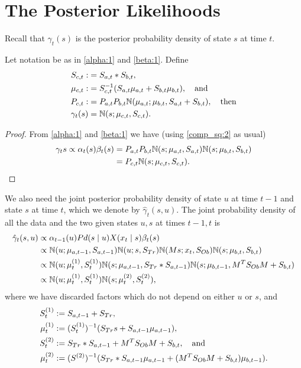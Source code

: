 \documentclass[12pt,leqno]{article}
\begin{document}
\section{The Posterior Likelihoods}
Recall that $\gamma_t(s)$ is the posterior probability density of state $s$
at time $t$. 
\begin{Thm}
  Let notation be as in \eqref{alpha:1} and \eqref{beta:1}.  Define
\begin{align*}
  S_{c,t} :&= S_{a,t}*S_{b,t}, \\
  \mu_{c,t} :&= S_{c,t}^{-1}(S_{a,t}\mu_{a,t} + S_{b,t}\mu_{b,t}), \quad\text{and}\\
  P_{c,t} :&= P_{a,t}P_{b,t}{\mathbb N}(\mu_{a,t};\mu_{b,t},S_{a,t}+S_{b,t}), \quad\text{then} \\
 \gamma_t(s) &= {\mathbb N}(s;\mu_{c,t},S_{c,t}).
  \end{align*}
\end{Thm}
\begin{proof}
  From \eqref{alpha:1} and \eqref{beta:1} we have (using \eqref{comp_sq:2}
  as usual)
  \begin{align*}
  \gamma_t{s} \propto \alpha_t(s)\beta_t(s) &= P_{a,t}P_{b,t}{\mathbb N}(s;\mu_{a,t},S_{a,t}){\mathbb N}(s;\mu_{b,t},S_{b,t})\\
  &= P_{c,t}{\mathbb N}(s;\mu_{c,t},S_{c,t}).
  \end{align*}
\end{proof}

We also need the joint posterior probability density of state $u$ at time $t-1$ and state $s$ at time $t$,
which we denote by $\hat{\gamma}_t(s,u)$. The joint probability density of all the data and the two given states
  $u,s$  at times $t-1,t$ is
  \begin{align}
    \hat{\gamma}_t(s,u) &\propto \alpha_{t-1}(u)Pd(s\mid u)X(x_t\mid s)\beta_t(s) \notag\\
    &\propto {\mathbb N}(u;\mu_{a,t-1},S_{a,t-1}){\mathbb N}(u;s,S_{Tr})  {\mathbb N}(Ms;x_t,S_{Ob}){\mathbb N}(s;\mu_{b,t},S_{b,t})\notag\\
    &\propto {\mathbb N}(u;\mu^{(1)}_t,S_t^{(1)}){\mathbb N}(s;\mu_{a,t-1},S_{Tr}*S_{a,t-1}){\mathbb N}(s;\mu_{b,t-1},M^TS_{Ob}M+S_{b,t})\notag\\
    &\propto {\mathbb N}(u;\mu^{(1)}_t,S_t^{(1)}){\mathbb N}(s;\mu^{(2)}_t,S^{(2)}_t),\label{gamma_hat}
  \end{align}
  where we have discarded factors which do not depend on either $u$ or $s$, and 
  \begin{align}
    S^{(1)}_t &:= S_{a,t-1}+S_{Tr},\notag\\
   \mu^{(1)}_t &:= (S_t^{(1)})^{-1}(S_{Tr}s + S_{a,t-1}\mu_{a,t-1}),\label{mu(1)}\\
    S^{(2)}_t &:= S_{Tr}*S_{a,t-1} + M^TS_{Ob}M+S_{b,t},\notag\quad\text{and}\\
    \mu^{(2)}_t &:= (S^{(2)})^{-1}(S_{Tr}*S_{a,t-1}\mu_{a,t-1} + (M^TS_{Ob}M+S_{b,t})\mu_{b,t-1})\label{mu(2)}.
  \end{align}
\end{document}
